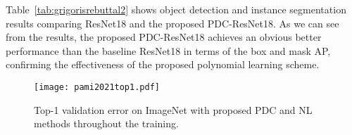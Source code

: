 \documentclass[runningheads]{llncs}
\begin{document}
Table~\ref{tab:grigorisrebuttal2} shows object detection and instance segmentation results comparing ResNet18 and the proposed PDC-ResNet18. As we can see from the results, the proposed PDC-ResNet18 achieves an obvious better performance than the baseline ResNet18 in terms of the box and mask AP, confirming the effectiveness of the proposed polynomial learning scheme.







\begin{figure} 
\centering
\centering
\texttt{[image: pami2021top1.pdf]}
\caption{Top-1 validation error on ImageNet with proposed PDC and NL methods throughout the training.}
\label{fig:imagenet}
\end{figure}




 
\end{document}
